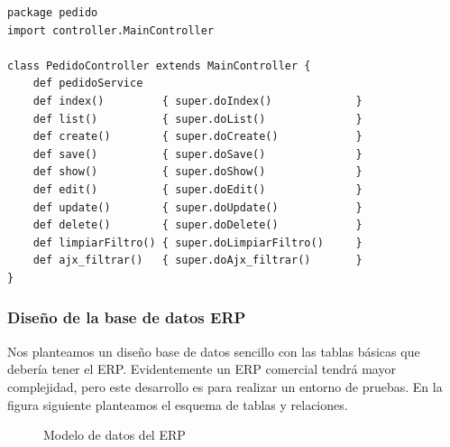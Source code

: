 \begin{lstlisting}[style=JAVA]
package pedido
import controller.MainController

class PedidoController extends MainController {
	def pedidoService
	def index() 		{ super.doIndex() 			  }
	def list() 			{ super.doList() 			  }
	def create() 		{ super.doCreate() 			  }
	def save() 			{ super.doSave()  			  }
	def show() 			{ super.doShow()  			  }
	def edit() 			{ super.doEdit()  			  }
	def update() 		{ super.doUpdate()  		  }
	def delete() 		{ super.doDelete()    		  }
	def limpiarFiltro() { super.doLimpiarFiltro()     }
	def ajx_filtrar()	{ super.doAjx_filtrar()       }
}
\end{lstlisting}


\subsubsection{Diseño de la base de datos ERP}

Nos planteamos un diseño base de datos sencillo con las tablas básicas que debería tener el ERP. Evidentemente un ERP comercial tendrá mayor complejidad, pero este desarrollo es para realizar un entorno de pruebas. En la figura siguiente planteamos el esquema de tablas y relaciones.

\begin{figure}[H]
	\centering
	\caption{Modelo de datos del ERP }
	\label{fig:pruebas-datos}
\end{figure}
